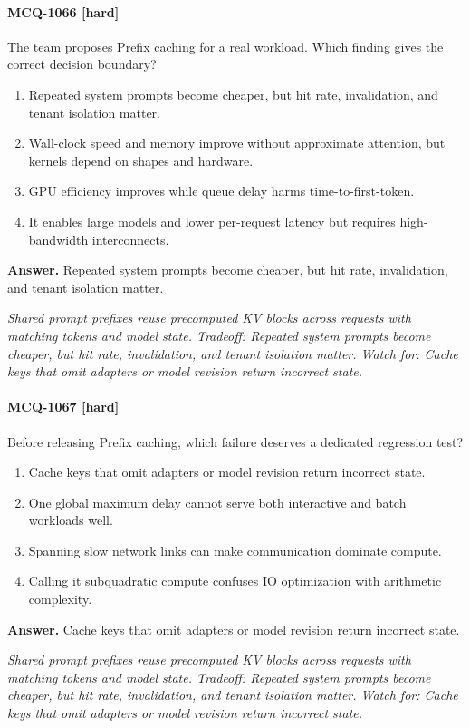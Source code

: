 \paragraph{MCQ-1066 [hard]} The team proposes Prefix caching for a real workload. Which finding gives the correct decision boundary?
\begin{enumerate}[label=\Alph*.]
\item Repeated system prompts become cheaper, but hit rate, invalidation, and tenant isolation matter.
\item Wall-clock speed and memory improve without approximate attention, but kernels depend on shapes and hardware.
\item GPU efficiency improves while queue delay harms time-to-first-token.
\item It enables large models and lower per-request latency but requires high-bandwidth interconnects.
\end{enumerate}
\noindent\textbf{Answer.} Repeated system prompts become cheaper, but hit rate, invalidation, and tenant isolation matter.
\par\textit{Shared prompt prefixes reuse precomputed KV blocks across requests with matching tokens and model state. Tradeoff: Repeated system prompts become cheaper, but hit rate, invalidation, and tenant isolation matter. Watch for: Cache keys that omit adapters or model revision return incorrect state.}
\paragraph{MCQ-1067 [hard]} Before releasing Prefix caching, which failure deserves a dedicated regression test?
\begin{enumerate}[label=\Alph*.]
\item Cache keys that omit adapters or model revision return incorrect state.
\item One global maximum delay cannot serve both interactive and batch workloads well.
\item Spanning slow network links can make communication dominate compute.
\item Calling it subquadratic compute confuses IO optimization with arithmetic complexity.
\end{enumerate}
\noindent\textbf{Answer.} Cache keys that omit adapters or model revision return incorrect state.
\par\textit{Shared prompt prefixes reuse precomputed KV blocks across requests with matching tokens and model state. Tradeoff: Repeated system prompts become cheaper, but hit rate, invalidation, and tenant isolation matter. Watch for: Cache keys that omit adapters or model revision return incorrect state.}
